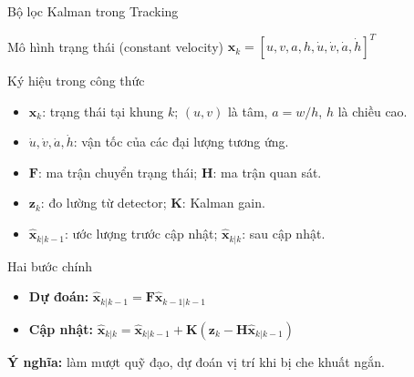 \begin{frame}[allowframebreaks]{Bộ lọc Kalman trong Tracking}
    \begin{block}{Mô hình trạng thái (constant velocity)}
    $\mathbf{x}_k = [u, v, a, h, \dot{u}, \dot{v}, \dot{a}, \dot{h}]^T$
    \end{block}
    \begin{block}{Ký hiệu trong công thức}
    \begin{itemize}
        \item $\mathbf{x}_k$: trạng thái tại khung $k$; $(u,v)$ là tâm, $a=w/h$, $h$ là chiều cao.
        \item $\dot{u}, \dot{v}, \dot{a}, \dot{h}$: vận tốc của các đại lượng tương ứng.
        \item $\mathbf{F}$: ma trận chuyển trạng thái; $\mathbf{H}$: ma trận quan sát.
        \item $\mathbf{z}_k$: đo lường từ detector; $\mathbf{K}$: Kalman gain.
        \item $\hat{\mathbf{x}}_{k|k-1}$: ước lượng trước cập nhật; $\hat{\mathbf{x}}_{k|k}$: sau cập nhật.
    \end{itemize}
    \end{block}
    \begin{block}{Hai bước chính}
    \begin{itemize}
        \item \textbf{Dự đoán:} $\hat{\mathbf{x}}_{k|k-1} = \mathbf{F}\hat{\mathbf{x}}_{k-1|k-1}$
        \item \textbf{Cập nhật:} $\hat{\mathbf{x}}_{k|k} = \hat{\mathbf{x}}_{k|k-1} + \mathbf{K}(\mathbf{z}_k-\mathbf{H}\hat{\mathbf{x}}_{k|k-1})$
    \end{itemize}
    \end{block}
    \textbf{Ý nghĩa:} làm mượt quỹ đạo, dự đoán vị trí khi bị che khuất ngắn.
\end{frame}

